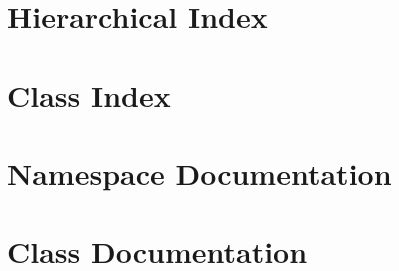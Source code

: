 \documentclass[twoside]{book}
\newcommand{\+}{\discretionary{\mbox{\scriptsize$\hookleftarrow$}}{}{}}
\newcommand{\clearemptydoublepage}{%
    \newpage{\pagestyle{empty}\cleardoublepage}%
  }
\begin{document}
\begin{CJK}{UTF8}{min}
\chapter{Hierarchical Index}

\chapter{Class Index}

\chapter{Namespace Documentation}





\chapter{Class Documentation}














  \backmatter
  \newpage
  \clearemptydoublepage
  \printindex
\end{CJK}
\end{document}
